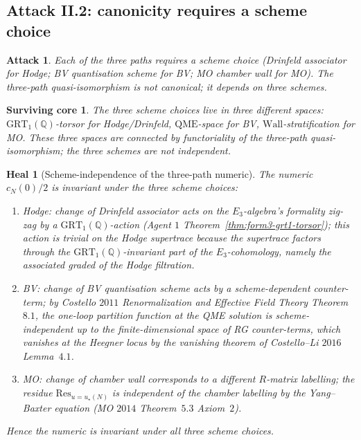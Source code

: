 \documentclass[11pt]{amsart}
\newtheorem{attack}[theorem]{Attack}
\newtheorem{surviving}[theorem]{Surviving core}
\newtheorem{heal}[theorem]{Heal}
\providecommand{\Q}{\mathbb{Q}}
\providecommand{\GRT}{\mathrm{GRT}}
\begin{document}
\subsection{Attack II.2: canonicity requires a scheme choice}

\begin{attack}
\label{att:scheme-choice}
Each of the three paths requires a scheme choice (Drinfeld associator
for Hodge; BV quantisation scheme for BV; MO chamber wall for MO).
The three-path quasi-isomorphism is not canonical; it depends on
three schemes.
\end{attack}

\begin{surviving}
\label{surv:scheme-independence}
The three scheme choices live in three different spaces:
$\GRT_1(\Q)$-torsor for Hodge/Drinfeld, $\mathrm{QME}$-space for BV,
$\mathrm{Wall}$-stratification for MO. These three spaces are
connected by functoriality of the three-path quasi-isomorphism; the
three schemes are not independent.
\end{surviving}

\begin{heal}[Scheme-independence of the three-path numeric]
\label{heal:scheme-independence}
The numeric $c_N(0)/2$ is invariant under the three scheme choices:
\begin{enumerate}[label=\textup{(\roman*)}]
\item Hodge: change of Drinfeld associator acts on the
$E_3$-algebra's formality zig-zag by a $\GRT_1(\Q)$-action
(Agent $1$ Theorem~\ref{thm:form3-grt1-torsor}); this action is
trivial on the Hodge supertrace because the supertrace factors through
the $\GRT_1(\Q)$-invariant part of the $E_3$-cohomology, namely the
associated graded of the Hodge filtration.
\item BV: change of BV quantisation scheme acts by a scheme-dependent
counter-term; by Costello $2011$ \emph{Renormalization and Effective
Field Theory} Theorem~$8.1$, the one-loop partition function at the
QME solution is scheme-independent up to the finite-dimensional space
of RG counter-terms, which vanishes at the Heegner locus by the
vanishing theorem of Costello--Li $2016$ Lemma~$4.1$.
\item MO: change of chamber wall corresponds to a different
$R$-matrix labelling; the residue $\mathrm{Res}_{u = u_\star(N)}$ is
independent of the chamber labelling by the Yang--Baxter equation
(MO $2014$ Theorem~$5.3$ Axiom~$2$).
\end{enumerate}
Hence the numeric is invariant under all three scheme choices.
\end{heal}
\end{document}

